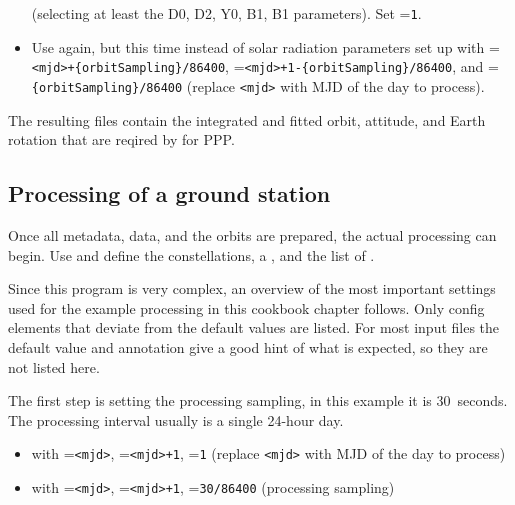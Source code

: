 \begin{itemize}
        (selecting at least the D0, D2, Y0, B1, B1 parameters). Set =\verb|1|.
  \item Use  again, but this time instead of solar radiation parameters set up
         with
        =\verb|<mjd>+{orbitSampling}/86400|, =\verb|<mjd>+1-{orbitSampling}/86400|,
        and =\verb|{orbitSampling}/86400| (replace \verb|<mjd>| with MJD of the day to process).
\end{itemize}

The resulting  files contain the integrated and fitted orbit, attitude, and Earth rotation
that are reqired by  for PPP.

\subsection{Processing of a ground station}\label{cookbook.gnssPpp:processing}

Once all metadata, data, and the orbits are prepared, the actual processing can begin.
Use  and define the 
constellations, a , and
the list of .

Since this program is very complex, an overview of the most important settings used for the example
processing in this cookbook chapter follows. Only config elements that deviate from the default values are listed.
For most input files the default value and annotation give a good hint of what is expected, so they are not
listed here.

The first step is setting the processing sampling, in this example it is 30~seconds.
The processing interval usually is a single 24-hour day.
\begin{itemize}
  \item {} with =\verb|<mjd>|,
        =\verb|<mjd>+1|, =\verb|1| (replace \verb|<mjd>| with MJD of the day to process)
  \item {} with =\verb|<mjd>|,
        =\verb|<mjd>+1|, =\verb|30/86400| (processing sampling)
\end{itemize}

